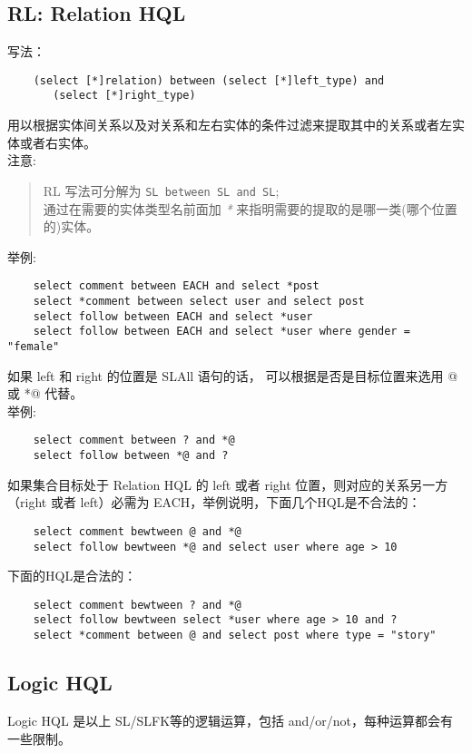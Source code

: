 \documentclass[10pt,a4paper]{article}
\begin{document}
\begin{CJK}{UTF8}{gbsn}
  \subsection{RL: Relation HQL}
  写法：
\begin{verbatim}
    (select [*]relation) between (select [*]left_type) and
       (select [*]right_type)
\end{verbatim}
  用以根据实体间关系以及对关系和左右实体的条件过滤来提取其中的关系或者左实体或者右实体。\\

  注意:
  \begin{quote}
    RL 写法可分解为 \texttt{SL between SL and SL};\\
    通过在需要的实体类型名前面加 \emph{*} 来指明需要的提取的是哪一类(哪个位置的)实体。
  \end{quote}

  举例:
\begin{verbatim}
    select comment between EACH and select *post
    select *comment between select user and select post
    select follow between EACH and select *user
    select follow between EACH and select *user where gender = "female"
\end{verbatim}

  如果 left 和 right 的位置是 SLAll 语句的话， 可以根据是否是目标位置来选用 @ 或 *@ 代替。\\

  举例:
\begin{verbatim}
    select comment between ? and *@
    select follow between *@ and ?
\end{verbatim}

  如果集合目标处于 Relation HQL 的 left 或者 right 位置，则对应的关系另一方（right 或者 left）必需为 EACH，举例说明，下面几个HQL是不合法的：
\begin{verbatim}
    select comment bewtween @ and *@
    select follow bewtween *@ and select user where age > 10
\end{verbatim}

  下面的HQL是合法的：

\begin{verbatim}
    select comment bewtween ? and *@
    select follow bewtween select *user where age > 10 and ?
    select *comment between @ and select post where type = "story"
\end{verbatim}

  \subsection{Logic HQL}
  Logic HQL 是以上 SL/SLFK等的逻辑运算，包括 and/or/not，每种运算都会有一些限制。


\end{CJK}
\end{document}
